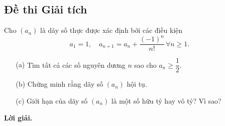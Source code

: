 \newpage
\subsection{Đề thi Giải tích}

\begin{tcolorbox}[title=\textbf{Bài toán B.1 + A.1.},breakable]
    Cho $(a_n)$ là dãy số thực được xác định bởi các điều kiện $$a_1 = 1,\quad a_{n+1} = a_n + \dfrac{(-1)^n}{n!} \,\forall n \geq 1.$$
    \begin{enumerate}
        \item[(a)] {Tìm tất cả các số nguyên dương $n$ sao cho $a_n \geq \dfrac{1}{2}$.}
        \item[(b)] {Chứng minh rằng dãy số $(a_n)$ hội tụ.} 
        \item[(c)] Giới hạn của dãy số $(a_n)$ là một số hữu tỷ hay vô tỷ? Vì sao? 
    \end{enumerate}
\end{tcolorbox}

\textbf{Lời giải. }

